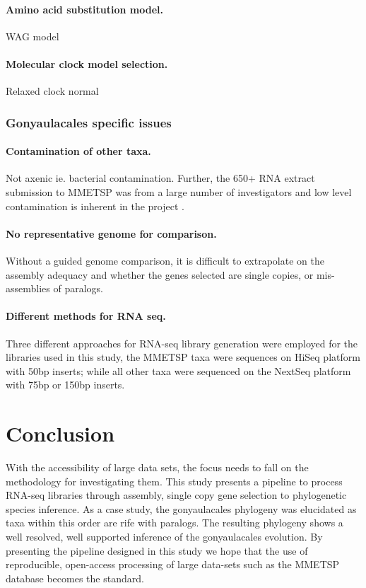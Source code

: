 \documentclass[12pt]{article}
\begin{document}
\paragraph*{Amino acid substitution model.} WAG model
\paragraph*{Molecular clock model selection.} Relaxed clock normal
\subsubsection*{Gonyaulacales specific issues}
\paragraph*{Contamination of other taxa.} Not axenic ie. bacterial contamination. Further, the 650+ RNA extract submission to MMETSP was from a large number of investigators and low level contamination is inherent in the project \cite{keeling2014marine}. 
\paragraph*{No representative genome for comparison.} Without a guided genome comparison, it is difficult to extrapolate on the assembly adequacy and whether the genes selected are single copies, or  mis-assemblies of paralogs.
\paragraph*{Different methods for RNA seq.} Three different approaches for RNA-seq library generation were employed for the libraries used in this study, the MMETSP taxa were sequences on HiSeq platform with 50bp inserts; while all other taxa were sequenced on the NextSeq platform with 75bp or 150bp inserts.

\newpage
\section{Conclusion}
With the accessibility of large data sets, the focus needs to fall on the methodology for investigating them. This study presents a pipeline to process RNA-seq libraries through assembly, single copy gene selection to phylogenetic species inference. As a case study, the gonyaulacales phylogeny was elucidated as taxa within this order are rife with paralogs. The resulting phylogeny shows a well resolved, well supported inference of the gonyaulacales evolution. By presenting the pipeline designed in this study we hope that the use of reproducible, open-access processing of large data-sets such as the MMETSP database becomes the standard.  
\newpage
\end{document}
